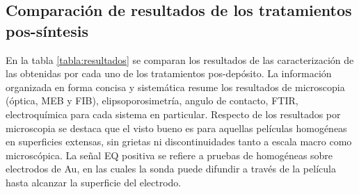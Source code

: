 	 \subsection{Comparación de resultados de los tratamientos pos-síntesis}
	 		
	 		En la tabla \ref{tabla:resultados} se comparan los resultados de las caracterización de las \pdm\space obtenidas por cada uno de los tratamientos pos-depósito. La información organizada en forma concisa y sistemática resume los resultados de microscopia (óptica, MEB y FIB), elipsoporosimetría, angulo de contacto, FTIR, electroquímica para cada sistema en particular. Respecto de los resultados por microscopia se destaca que el visto bueno es para aquellas películas homogéneas en superficies extensas, sin grietas ni discontinuidades tanto a escala macro como microscópica. La señal EQ positiva se refiere a pruebas de \pdm\space homogéneas sobre electrodos de Au, en las cuales la sonda puede difundir a través de la película hasta alcanzar la superficie del electrodo.


	 
